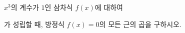 $x^3$의 계수가 $1$인 삼차식 $f(x)$에 대하여 \par\smallskip{}\par\smallskip\noindent 가 성립할 때, 방정식 $f(x)=0$의 모든 근의 곱을 구하시오.
